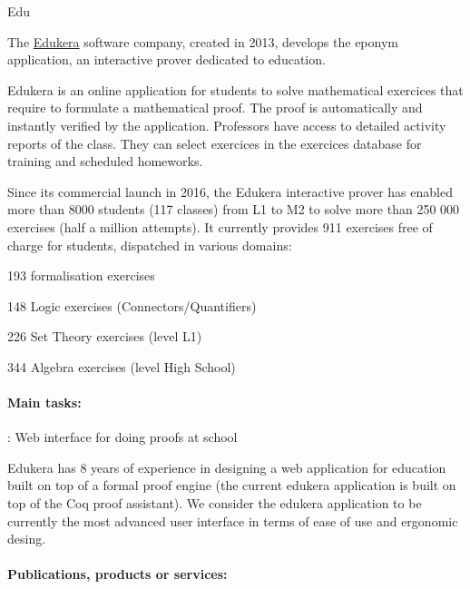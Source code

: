 \begin{sitedescription}{Edu}


The \hyperlink{https://www.edukera.com}{Edukera} software company, created in 2013,
develops the eponym application, an interactive prover dedicated to education.

Edukera is an online application for students to solve mathematical exercices that require to
formulate a mathematical proof. The proof is automatically and instantly verified by the application. Professors
have access to detailed activity reports of the class. They can select exercices in the exercices database
for training and scheduled homeworks.

Since its commercial launch in 2016, the Edukera interactive prover has enabled more than 8000 students
(117 classes) from L1 to M2 to solve more than 250 000 exercises (half a million attempts). It currently
provides 911 exercises free of charge for students, dispatched in various domains:
\begin{compactitem}
\item 193 formalisation exercises
\item 148 Logic exercises (Connectors/Quantifiers)
\item 226 Set Theory exercises (level L1)
\item 344 Algebra exercises (level High School)
\end{compactitem}

\paragraph*{Main tasks:}

\begin{compactitem}
\item {} : Web interface for doing proofs at school

Edukera has 8 years of experience in designing a web application for education built on top of a formal proof engine
(the current edukera application is built on top of the Coq proof assistant). We consider the edukera application to be
currently the most advanced user interface in terms of ease of use and ergonomic desing.

\end{compactitem}

\paragraph*{Publications, products or services:}


\end{sitedescription}
